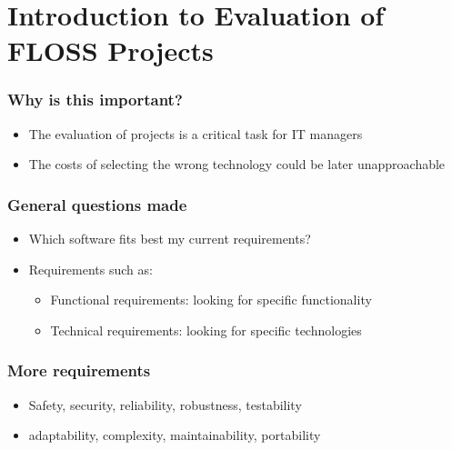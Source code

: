 

\section{Introduction to Evaluation of FLOSS Projects}


\begin{frame}
\frametitle{Why is this important?}

\begin{itemize}
\item The evaluation of projects is a critical task for IT managers
\item The costs of selecting the wrong technology could be later unapproachable
\end{itemize}
\end{frame}




\begin{frame}
\frametitle{General questions made}

\begin{itemize}
\item Which software fits best my current requirements?
\item Requirements such as:
 \begin{itemize}
  \item Functional requirements: looking for specific functionality
  \item Technical requirements: looking for specific technologies
 \end{itemize}
\end{itemize}
\end{frame}


\begin{frame}
\frametitle{More requirements}

\begin{itemize}
\item Safety, security, reliability, robustness, testability
\item adaptability, complexity, maintainability, portability

\end{itemize}
\end{frame}

